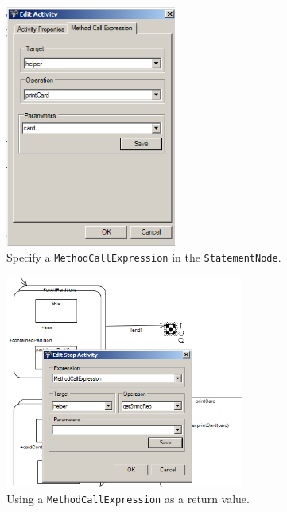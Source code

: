 \begin{figure}[htbp]
\begin{center}
  \includegraphics[width=0.5\textwidth]{pics/sdmBilder/toString/sdm74}
  \caption{Specify a \texttt{MethodCallExpression} in the
  \texttt{StatementNode}.}
  \label{fig:sdm_invert_3}
\end{center}
\end{figure}

\begin{figure}[htbp]
\begin{center}
  \includegraphics[width=0.7\textwidth]{pics/sdmBilder/toString/sdm75}
  \caption{Using a \texttt{MethodCallExpression} as a return value.}  
  \label{fig:sdm_invert_4}
\end{center}
\end{figure}


